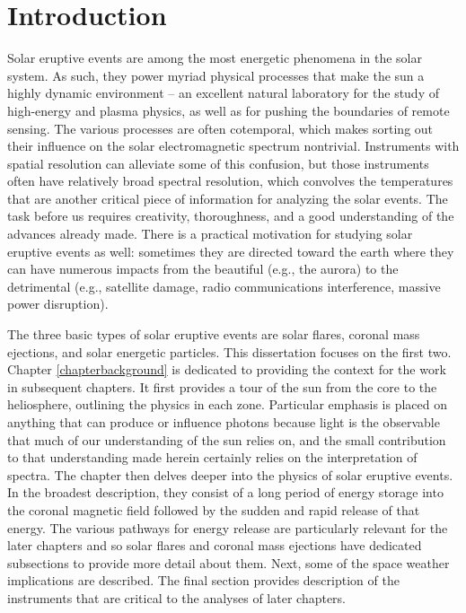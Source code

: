 \chapter{Introduction}
\label{chapterintro}

Solar eruptive events are among the most energetic phenomena in the solar system. As such, they power myriad physical processes that make the sun a highly dynamic environment -- an excellent natural laboratory for the study of high-energy and plasma physics, as well as for pushing the boundaries of remote sensing. The various processes are often cotemporal, which makes sorting out their influence on the solar electromagnetic spectrum nontrivial. Instruments with spatial resolution can alleviate some of this confusion, but those instruments often have relatively broad spectral resolution, which convolves the temperatures that are another critical piece of information for analyzing the solar events. The task before us requires creativity, thoroughness, and a good understanding of the advances already made. There is a practical motivation for studying solar eruptive events as well: sometimes they are directed toward the earth where they can have numerous impacts from the beautiful (e.g., the aurora) to the detrimental (e.g., satellite damage, radio communications interference, massive power disruption). 

The three basic types of solar eruptive events are solar flares, coronal mass ejections, and solar energetic particles. This dissertation focuses on the first two. Chapter \ref{chapterbackground} is dedicated to providing the context for the work in subsequent chapters. It first provides a tour of the sun from the core to the heliosphere, outlining the physics in each zone. Particular emphasis is placed on anything that can produce or influence photons because light is the observable that much of our understanding of the sun relies on, and the small contribution to that understanding made herein certainly relies on the interpretation of spectra. The chapter then delves deeper into the physics of solar eruptive events. In the broadest description, they consist of a long period of energy storage into the coronal magnetic field followed by the sudden and rapid release of that energy. The various pathways for energy release are particularly relevant for the later chapters and so solar flares and coronal mass ejections have dedicated subsections to provide more detail about them. Next, some of the space weather implications are described. The final section provides description of the instruments that are critical to the analyses of later chapters. 

